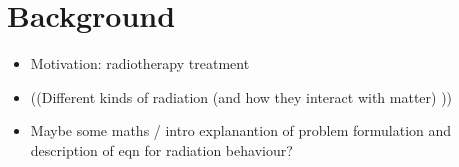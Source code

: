 \section{Background}
\begin{itemize}
    \item Motivation: radiotherapy treatment 
    \item ((Different kinds of radiation (and how they interact with matter) ))
    \item Maybe some maths / intro explanantion of problem formulation and description of eqn for radiation behaviour?
\end{itemize}